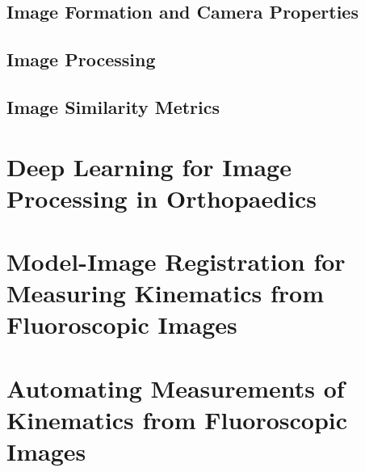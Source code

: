 \subsection{Image Formation and Camera Properties}

\subsection{Image Processing}

\subsection{Image Similarity Metrics}


\section{Deep Learning for Image Processing in Orthopaedics}


\section{Model-Image Registration for Measuring Kinematics from Fluoroscopic Images}


\section{Automating Measurements of Kinematics from Fluoroscopic Images}
